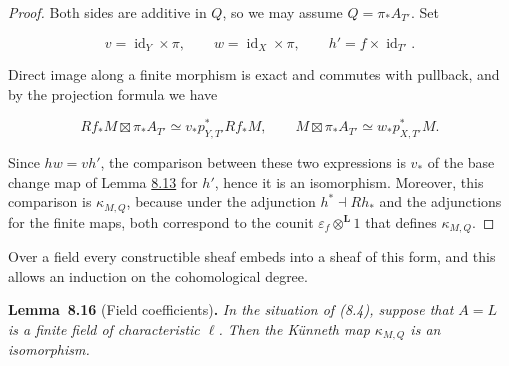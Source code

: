 \documentclass[11pt]{article}
\newenvironment{bpstatement}[2]{\par\addvspace{0.6\baselineskip}\noindent\textbf{#1}#2\textbf{.}\enspace\ignorespaces}
  {\par\addvspace{0.4\baselineskip}}
\newenvironment{bpstatementit}[2]{\begin{bpstatement}{#1}{#2}\itshape\ignorespaces}{\end{bpstatement}}
\begin{document}
\begin{proof}[{Proof}]\label{bp693}%
Both sides are additive in \(Q\), so we may assume \(Q=\pi_*A_{T'}\). Set

\[
v=\operatorname{id}_Y\times\pi,\qquad
w=\operatorname{id}_X\times\pi,\qquad
h'=f\times\operatorname{id}_{T'}.
\]

Direct image along a finite morphism is exact and commutes with pullback, and by the projection formula we have

\[
Rf_*M\boxtimes\pi_*A_{T'}
\simeq v_*p_{Y,T'}^*Rf_*M,
\qquad
M\boxtimes\pi_*A_{T'}\simeq w_*p_{X,T'}^*M.
\]

Since \(hw=vh'\), the comparison between these two expressions is \(v_*\) of the base change map of Lemma \hyperref[bp687]{8.13} for \(h'\), hence it is an isomorphism. Moreover, this comparison is \(\kappa_{M,Q}\), because under the adjunction \(h^*\dashv Rh_*\) and the adjunctions for the finite maps, both correspond to the counit \(\varepsilon_f\otimes^{\mathbf L}1\) that defines \(\kappa_{M,Q}\).
\end{proof}

\label{bp694}%
Over a field every constructible sheaf embeds into a sheaf of this form, and this allows an induction on the cohomological degree.

\label{bp695}%
\begin{bpstatementit}{Lemma~8.16}{ (Field coefficients)}
In the situation of (8.4), suppose that \(A=L\) is a finite field of characteristic \(\ell\). Then the Künneth map \(\kappa_{M,Q}\) is an isomorphism.
\end{bpstatementit}
\end{document}
